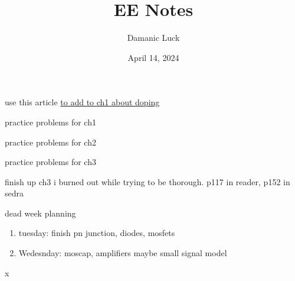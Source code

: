 \documentclass[10pt, openany]{book}
\title{EE Notes}
\author{Damanic Luck}
\date{April 14, 2024}
\begin{document}



\tableofcontents
\begin{todo}
    \item use this article \href{http://home.iitj.ac.in/~sptiwari/EE314/Lecture2_Semi_Basics_Junction.pdf}{to add to ch1 about doping}
    \item practice problems for ch1
    \item practice problems for ch2
    \item practice problems for ch3
    \item finish up ch3 i burned out while trying to be thorough. p117 in reader, p152 in sedra
    \item dead week planning
    \begin{enumerate}
        \item tuesday: finish pn junction, diodes, mosfets
        \item Wedesnday: moscap, amplifiers maybe small signal model
    \end{enumerate}x
\end{todo}

\newpage


\newpage


\newpage

\end{document}
